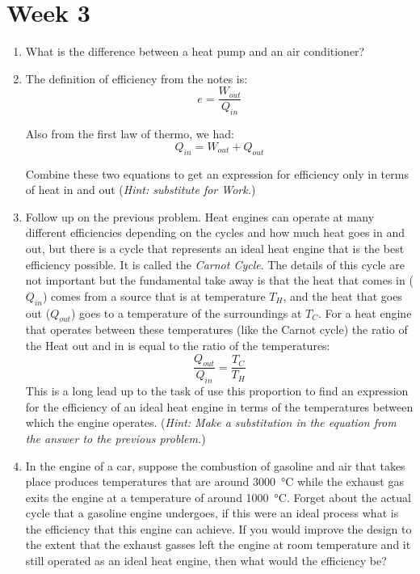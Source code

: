 \section*{Week 3}
\begin{enumerate}
\setlength\itemsep{2 in}
\setcounter{enumi}{\value{counter}}
\item
What is the difference between a heat pump and an air conditioner? 

\item
The definition of efficiency from the notes is: \[e = \frac{W_{out}}{Q_{in}}\]

Also from the first law of thermo, we had: \[Q_{in} = W_{out}+Q_{out}\]

Combine these two equations to get an expression for efficiency only in terms of heat in and out (\emph{Hint: substitute for Work.})

\item
Follow up on the previous problem. Heat engines can operate at many different efficiencies depending on the cycles and how much heat goes in and out, but there is a cycle that represents an ideal heat engine that is the best efficiency possible. It is called the \emph{Carnot Cycle}. The details of this cycle are not important but the fundamental take away is that the heat that comes in ($Q_{in}$) comes from a source that is at temperature $T_H$, and the heat that goes out ($Q_{out}$) goes to a temperature of the surroundings at $T_C$. For a heat engine that operates between these temperatures (like the Carnot cycle) the ratio of the Heat out and in is equal to the ratio of the temperatures: \[\frac{Q_{out}}{Q_{in}}=\frac{T_C}{T_H}\]
This is a long lead up to the task of use this proportion to find an expression for the efficiency of an ideal heat engine in terms of the temperatures between which the engine operates. (\emph{Hint: Make a substitution in the equation from the answer to the previous problem.})

\item
In the engine of a car, suppose the combustion of gasoline and air that takes place produces temperatures that are around \SI{3000}{\celsius} while the exhaust gas exits the engine at a temperature of around \SI{1000}{\celsius}. Forget about the actual cycle that a gasoline engine undergoes, if this were an ideal process what is the efficiency that this engine can achieve. If you would improve the design to the extent that the exhaust gasses left the engine at room temperature and it still operated as an ideal heat engine, then what would the efficiency be? 
	
\setcounter{counter}{\value{enumi}}
\end{enumerate}

